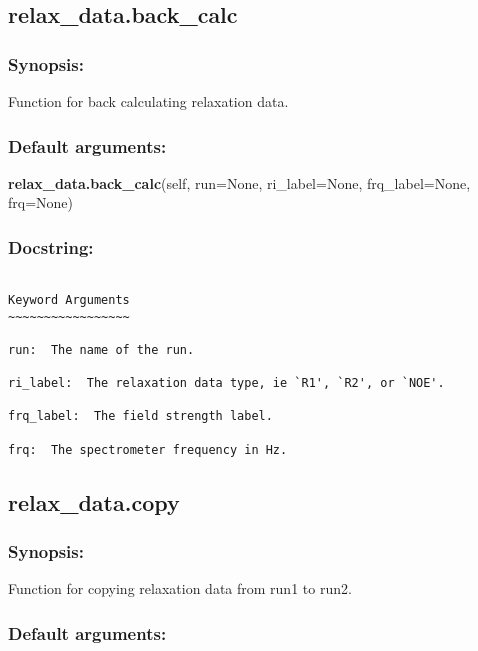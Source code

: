 \subsection{relax\_data.back\_calc}


\subsubsection{Synopsis:}

Function for back calculating relaxation data.

\subsubsection{Default arguments:}

\textsf{\textbf{relax\_data.back\_calc}(self, run=None, ri\_label=None, frq\_label=None, frq=None)
}


\subsubsection{Docstring:}

{\scriptsize
\begin{verbatim}

Keyword Arguments
~~~~~~~~~~~~~~~~~

run:  The name of the run.

ri_label:  The relaxation data type, ie `R1', `R2', or `NOE'.

frq_label:  The field strength label.

frq:  The spectrometer frequency in Hz.
\end{verbatim}
}



\newpage

\subsection{relax\_data.copy}


\subsubsection{Synopsis:}

Function for copying relaxation data from run1 to run2.

\subsubsection{Default arguments:}

